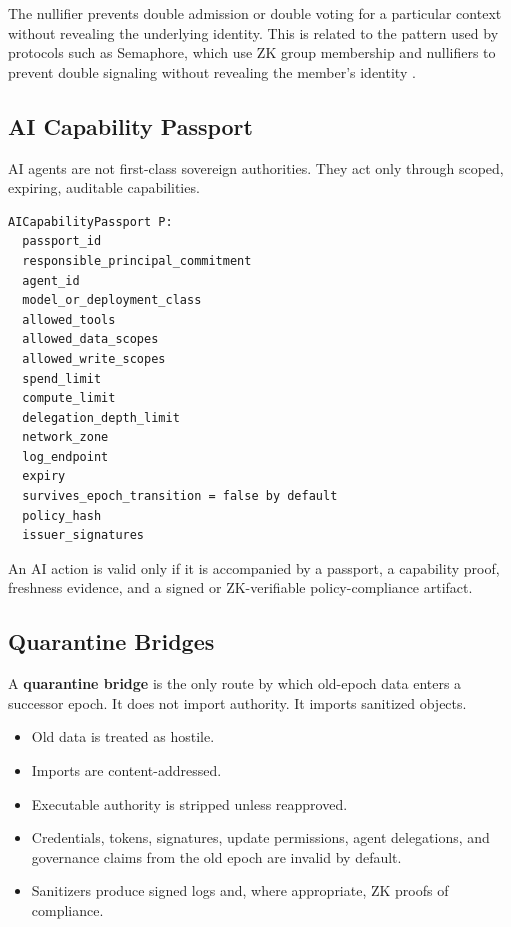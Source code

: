 \documentclass[11pt,letterpaper]{article}
\newcommand{\Term}[1]{\textbf{#1}}
\begin{document}
The nullifier prevents double admission or double voting for a particular context without revealing the underlying identity. This is related to the pattern used by protocols such as Semaphore, which use ZK group membership and nullifiers to prevent double signaling without revealing the member's identity \cite{semaphore}.

\subsection{AI Capability Passport}

AI agents are not first-class sovereign authorities. They act only through scoped, expiring, auditable capabilities.

\begin{lstlisting}[title={\textbf{AI Capability Passport}}]
AICapabilityPassport P:
  passport_id
  responsible_principal_commitment
  agent_id
  model_or_deployment_class
  allowed_tools
  allowed_data_scopes
  allowed_write_scopes
  spend_limit
  compute_limit
  delegation_depth_limit
  network_zone
  log_endpoint
  expiry
  survives_epoch_transition = false by default
  policy_hash
  issuer_signatures
\end{lstlisting}

An AI action is valid only if it is accompanied by a passport, a capability proof, freshness evidence, and a signed or ZK-verifiable policy-compliance artifact.

\subsection{Quarantine Bridges}

A \Term{quarantine bridge} is the only route by which old-epoch data enters a successor epoch. It does not import authority. It imports sanitized objects.

\begin{itemize}[leftmargin=1.4em]
\item Old data is treated as hostile.
\item Imports are content-addressed.
\item Executable authority is stripped unless reapproved.
\item Credentials, tokens, signatures, update permissions, agent delegations, and governance claims from the old epoch are invalid by default.
\item Sanitizers produce signed logs and, where appropriate, ZK proofs of compliance.
\end{itemize}
\end{document}
